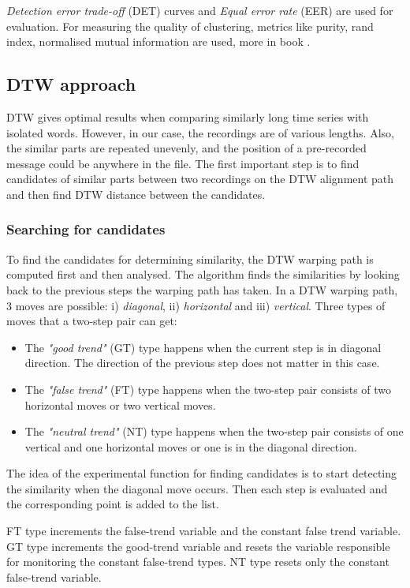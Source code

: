 \documentclass{ExcelAtFIT}
\begin{document}
\textit{Detection error trade-off} (DET) curves \cite{DETcurve} and \textit{Equal error rate} (EER) \cite{EER} are used for evaluation.
For measuring the quality of clustering, metrics like purity, rand index, normalised mutual information are used, more in book \cite{ClusterEvalBook}. 


\subsection{DTW approach}
\label{DTWapproach}
DTW gives optimal results when comparing similarly long time series with isolated words. However, in our case, the recordings are of various lengths. Also, the similar parts are repeated unevenly, and the position of a pre-recorded message could be anywhere in the file. The first important step is to find candidates of similar parts between two recordings on the DTW alignment path and then find DTW distance between the candidates. 
\subsubsection*{Searching for candidates}
To find the candidates for determining similarity, the DTW warping path is computed first and then analysed. The algorithm finds the similarities by looking back to the previous steps the warping path has taken. In a DTW warping path, 3 moves are possible: i) \textit{diagonal}, ii) \textit{horizontal} and iii) \textit{vertical}. 
Three types of moves that a two-step pair can get:  
\begin{itemize}
    \item The \textit{"good trend"} (GT) type happens when the current step is in diagonal direction. The direction of the previous step does not matter in this case.
    \item The \textit{"false trend"} (FT) type happens when the two-step pair consists of two horizontal moves or two vertical moves.
    \item The \textit{"neutral trend"} (NT) type happens when the two-step pair consists of one vertical and one horizontal moves or one is in the diagonal direction.
\end{itemize}

The idea of the experimental function for finding candidates is to start detecting the similarity when the diagonal move occurs. Then each step is evaluated and the corresponding point is added to the list.

FT type increments the false-trend variable and the constant false trend variable. GT type increments the good-trend variable and resets the variable responsible for monitoring the constant false-trend types. NT type resets only the constant false-trend variable. 
\end{document}
